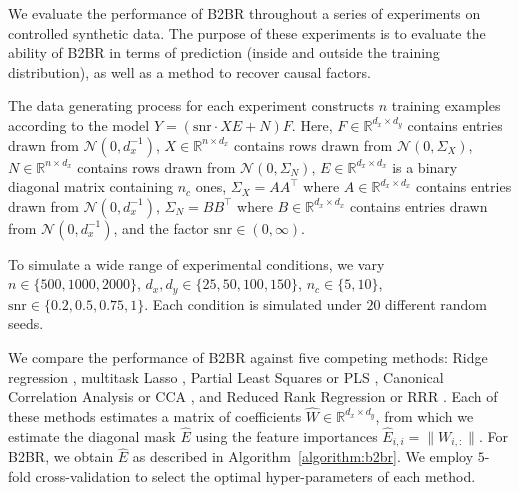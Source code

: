 We evaluate the performance of B2BR throughout a series of experiments on controlled synthetic data.
%
The purpose of these experiments is to evaluate the ability of B2BR in terms of prediction (inside and outside the training distribution), as well as a method to recover causal factors.

The data generating process for each experiment constructs $n$ training examples according to the model $Y = (\text{snr} \cdot XE + N)F$.
%
Here, 
    $F \in \mathbb{R}^{d_x \times d_y}$ contains entries drawn from $\mathcal{N}(0, d_x^{-1})$,
    $X \in \mathbb{R}^{n \times d_x}$ contains rows drawn from $\mathcal{N}(0, \Sigma_X)$,
    $N \in \mathbb{R}^{n \times d_x}$ contains rows drawn from $\mathcal{N}(0, \Sigma_N)$,
    $E \in \mathbb{R}^{d_x \times d_x}$ is a binary diagonal matrix containing $n_c$ ones,
    $\Sigma_X = AA^\top$ where $A \in \mathbb{R}^{d_x \times d_x}$ contains entries drawn from $\mathcal{N}(0, d_x^{-1})$,
    $\Sigma_N = BB^\top$ where $B \in \mathbb{R}^{d_x \times d_x}$ contains entries drawn from $\mathcal{N}(0, d_x^{-1})$,
and the factor $\text{snr} \in (0, \infty)$.

To simulate a wide range of experimental conditions, we vary $n \in \{500, 1000, 2000\}$, $d_x, d_y \in \{ 25, 50, 100, 150 \}$, $n_c \in \{ 5, 10 \}$, $\text{snr} \in \{ 0.2, 0.5, 0.75, 1 \}$. 
%
Each condition is simulated under $20$ different random seeds. 

We compare the performance of B2BR against five competing methods:
%
Ridge regression \citep{hoerl1959optimum}, multitask Lasso \citep{argyriou2008convex}, Partial Least Squares or PLS \citep{wold_pls, tenenhaus_pls}, Canonical Correlation Analysis or CCA \citep{cca_hotelling}, and Reduced Rank Regression or RRR \citep{Izenman_rrr}.
%
Each of these methods estimates a matrix of coefficients $\hat{W} \in \mathbb{R}^{d_x \times d_y}$, from which we estimate the diagonal mask $\hat{E}$ using the feature importances $\hat{E}_{i,i} = \| W_{i, :} \|$.
%
For B2BR, we obtain $\hat{E}$ as described in Algorithm~\ref{algorithm:b2br}.
%
We employ $5$-fold cross-validation to select the optimal hyper-parameters of each method. 

